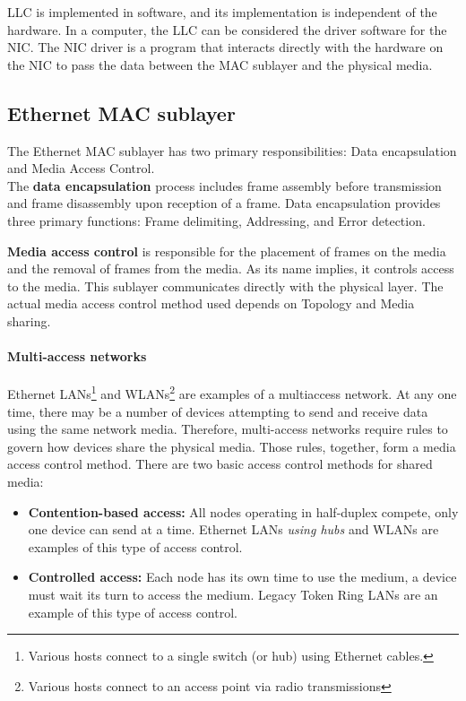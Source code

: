 LLC is implemented in software, and its implementation is independent of the hardware. In a computer, the LLC can be considered the driver software for the NIC. The NIC driver is a program that interacts directly with the hardware on the NIC to pass the data between the MAC sublayer and the physical media.

\subsection{Ethernet MAC sublayer}

The Ethernet MAC sublayer has two primary responsibilities: Data encapsulation and Media Access Control.\\

The \textbf{data encapsulation} process includes frame assembly before transmission and frame disassembly upon reception of a frame. Data encapsulation provides three primary functions: Frame delimiting, Addressing, and Error detection.

\textbf{Media access control} is responsible for the placement of frames on the media and the removal of frames from the media. As its name implies, it controls access to the media. This sublayer communicates directly with the physical layer. The actual media access control method used depends on Topology and Media sharing.\\

\paragraph{Multi-access networks} Ethernet LANs\footnote{Various hosts connect to a single switch (or hub) using Ethernet cables.} and WLANs\footnote{Various hosts connect to an access point via radio transmissions} are examples of a multiaccess network. At any one time, there may be a number of devices attempting to send and receive data using the same network media. Therefore, multi-access networks require rules to govern how devices share the physical media. Those rules, together, form a media access control method. There are two basic access control methods for shared media:

\begin{itemize}
\item \textbf{Contention-based access:} All nodes operating in half-duplex compete, only one device can send at a time. Ethernet LANs \emph{using hubs} and WLANs are examples of this type of access control.

\item \textbf{Controlled access:} Each node has its own time to use the medium, a device must wait its turn to access the medium. Legacy Token Ring LANs are an example of this type of access control. 
\end{itemize}


